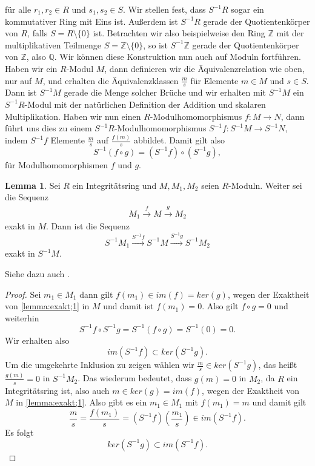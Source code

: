 \documentclass[11pt,titlepage]{article}
\newcommand{\setZ}{\mathbb{Z}}
\newcommand{\setQ}{\mathbb{Q}}
\theoremstyle{definition}
\newtheorem{lemma}[theorem]{Lemma}
\theoremstyle{remark}
\begin{document}
	für alle $r_1,r_2\in R$ und $s_1,s_2\in S$. Wir stellen fest, dass 
	$S^{-1}R$ sogar ein kommutativer Ring mit Eins ist. Außerdem ist 
	$S^{-1}R$ gerade der Quotientenkörper von $R$, falls $S=R\setminus\{0\}$ ist. Betrachten wir also beispielweise den Ring 
	$\setZ$ mit der multiplikativen Teilmenge $S=\setZ\setminus\{0\}$, so 
	ist $S^{-1}\setZ$ gerade der Quotientenkörper von $\setZ$, also 
	$\setQ$. Wir können diese Konstruktion nun auch auf Moduln fortführen. 
	Haben wir ein $R$-Modul $M$, dann definieren wir 
	die Äquivalenzrelation wie oben, nur auf $M$, und erhalten die 
	Äquivalenzklassen $\frac{m}{s}$ für Elemente $m\in M$ und $s\in S$. 
	Dann ist $S^{-1}M$ gerade die Menge solcher Brüche und wir erhalten 
	mit $S^{-1}M$ ein $S^{-1}R$-Modul mit der natürlichen Definition 
	der Addition und skalaren Multiplikation. Haben wir nun einen 
	$R$-Modulhomomorphismus $f:M\to N$, dann führt uns dies zu einem 
	$S^{-1}R$-Modulhomomorphismus $S^{-1}f:S^{-1}M\to S^{-1}N$, indem $S^{-1}f$ 
	Elemente $\frac{m}{s}$ auf $\frac{f(m)}{s}$ abbildet. Damit gilt also 
	\[S^{-1}(f\circ g)=(S^{-1}f)\circ(S^{-1}g),\]
	für Modulhomomorphismen $f$ und $g$.
	
	\begin{lemma} \label{lemma:Buch;exakt}
		Sei $R$ ein Integritätsring und $M,M_1,M_2$ seien $R$-Moduln. Weiter 
		sei die Sequenz
		\begin{align}
			M_1\xrightarrow{f}M\xrightarrow{g}M_2 \label{lemma:exakt;1}
		\end{align}
		exakt in $M$. Dann ist die Sequenz
		\[S^{-1}M_1 \xrightarrow{S^{-1}f}S^{-1}M\xrightarrow{S^{-1}g}S^{-1}M_2\]
		exakt in $S^{-1}M$.
	\end{lemma}
	
	Siehe dazu auch \cite[Proposition 3.3]{introductiontocomalg}.
	
	\begin{proof}
		Sei $m_1\in M_1$ dann gilt $f(m_1)\in im(f)=ker(g)$, wegen der Exaktheit 
		von \ref{lemma:exakt;1} in $M$ und damit ist $f(m_1)=0$. Also gilt 
		$f\circ g=0$ und weiterhin
		\[S^{-1}f \circ S^{-1}g = S^{-1}(f\circ g)=S^{-1}(0)=0.\]
		Wir erhalten also
		\[im(S^{-1}f)\subset ker(S^{-1}g).\]
		Um die umgekehrte Inklusion zu zeigen wählen wir 
		$\frac{m}{s}\in ker(S^{-1}g)$, das heißt $\frac{g(m)}{s}=0$ in $S^{-1}M_2$. 
		Das wiederum bedeutet, dass $g(m)=0$ in $M_2$, da $R$ ein Integritätsring 
		ist, also auch $m\in ker(g)=im(f)$, wegen der Exaktheit von $M$ in 
		\ref{lemma:exakt;1}. Also gibt es ein $m_1\in M_1$ mit $f(m_1)=m$ und damit 
		gilt
		\[\frac{m}{s}=\frac{f(m_1)}{s}=(S^{-1}f)\left(\frac{m_1}{s}\right)\in im(S^{-1}f).\]
		Es folgt 
		\[ker(S^{-1}g)\subset im(S^{-1}f).\]
	\end{proof}
\end{document}

